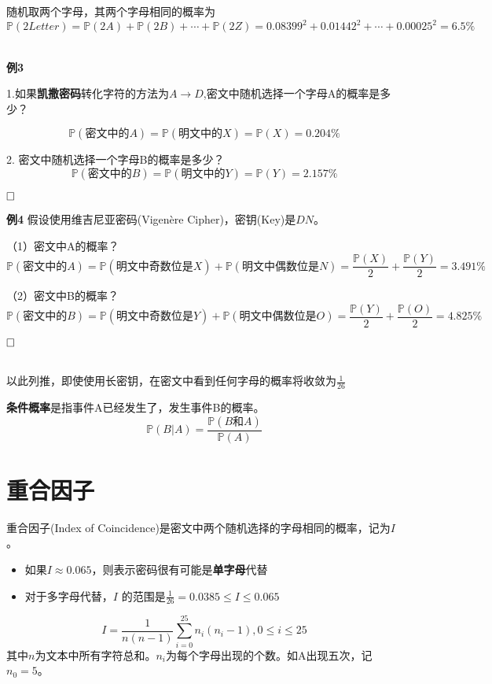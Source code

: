 \documentclass{article}
\begin{document}
随机取两个字母，其两个字母相同的概率为$\mathbb{P}(2 Letter) = \mathbb{P}(2A)+ \mathbb{P}(2B) + \cdots +\mathbb{P}(2Z)=0.08399^{2}+0.01442^{2}+ \cdots +0.00025^{2}=6.5\% $

~\\

\textbf{例3}

1.如果\textbf{凯撒密码}转化字符的方法为$A→D$,密文中随机选择一个字母A的概率是多少？

$$\mathbb{P}(\mbox{密文中的}A)  = \mathbb{P}(\mbox{明文中的}X) = \mathbb{P}(X) = 0.204\%$$

2. 密文中随机选择一个字母B的概率是多少？
$$\mathbb{P}(\mbox{密文中的}B)  = \mathbb{P}(\mbox{明文中的}Y) = \mathbb{P}(Y) = 2.157\% $$

$\hfill\square$ 



\textbf{例4}
假设使用维吉尼亚密码(Vigenère Cipher)，密钥(Key)是$DN$。

（1）密文中A的概率？
$$\mathbb{P}(\mbox{密文中的}A)  = \mathbb{P}(\mbox{明文中奇数位是}X) + \mathbb{P}(\mbox{明文中偶数位是}N)  = \frac{\mathbb{P}(X)}{2} + \frac{\mathbb{P}(Y)}{2} = 3.491\%$$

（2）密文中B的概率？
$$\mathbb{P}(\mbox{密文中的}B)  = \mathbb{P}(\mbox{明文中奇数位是}Y) + \mathbb{P}(\mbox{明文中偶数位是}O)  = \frac{\mathbb{P}(Y)}{2} + \frac{\mathbb{P}(O)}{2} = 4.825\%$$


$\hfill\square$ 



~\\

以此列推，即使使用长密钥，在密文中看到任何字母的概率将收敛为$\frac{1}{26}$

\textbf{条件概率}是指事件A已经发生了，发生事件B的概率。
$$\mathbb{P}(B|A) = \frac{\mathbb{P}(B \mbox{和} A)}{\mathbb{P}(A)}$$

\section{重合因子}
重合因子(Index of Coincidence)是密文中两个随机选择的字母相同的概率，记为$I$。

\begin{itemize}
\item 如果$I \approx 0.065$，则表示密码很有可能是\textbf{单字母}代替
\item 对于多字母代替，$I$ 的范围是$\frac{1}{26}=0.0385 \leq I \leq 0.065$
\end{itemize}

$$I = \frac{1}{n(n-1)} \sum_{i=0}^{25}n_i(n_i-1), 0 \leq i \leq25$$
其中$n$为文本中所有字符总和。$n_i$为每个字母出现的个数。如A出现五次，记$n_0 = 5$。
\end{document}
